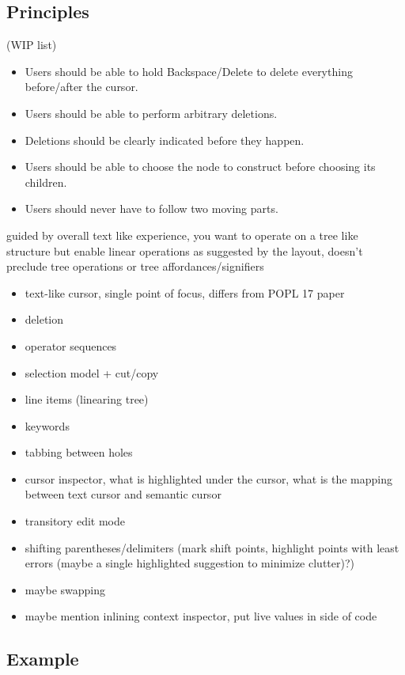 \documentclass[runningheads]{llncs}
\begin{document}
\subsection{Principles}

(WIP list)
\begin{itemize}
\item Users should be able to hold Backspace/Delete to delete everything before/after the cursor.
\item Users should be able to perform arbitrary deletions.
\item Deletions should be clearly indicated before they happen.
\item Users should be able to choose the node to construct before choosing its children.
\item Users should never have to follow two moving parts.
\end{itemize}

guided by overall text like experience, you want to operate on a tree like structure but enable linear operations as suggested by the layout, doesn't preclude tree operations or tree affordances/signifiers
\begin{itemize}
\item text-like cursor, single point of focus, differs from POPL 17 paper
\item deletion
\item operator sequences
\item selection model + cut/copy
\item line items (linearing tree)
\item keywords
\item tabbing between holes
\item cursor inspector, what is highlighted under the cursor, what is the mapping between text cursor and semantic cursor
\item transitory edit mode
\item shifting parentheses/delimiters (mark shift points, highlight points with least errors (maybe a single highlighted suggestion to minimize clutter)?)
\item maybe swapping
\item maybe mention inlining context inspector, put live values in side of code
\end{itemize}




\subsection{Example}
\end{document}

